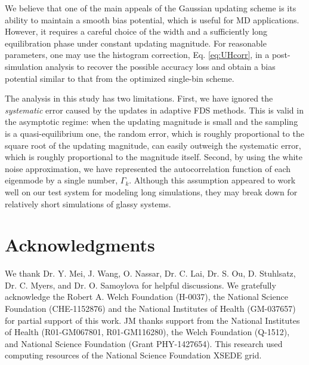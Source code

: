 \documentclass[reprint, superscriptaddress, floatfix]{revtex4-1}
\begin{document}
We believe that one of the main appeals
of the Gaussian updating scheme
is its ability to maintain a smooth bias potential,
which is useful for MD applications.
%
However, it requires a careful choice of the width and
a sufficiently long equilibration phase under constant updating magnitude.
%
For reasonable parameters,
one may use the histogram correction, Eq. \eqref{eq:UHcorr},
in a post-simulation analysis
to recover the possible accuracy loss
and obtain a bias potential similar to
that from the optimized single-bin scheme.



The analysis in this study has two limitations.
%
First, we have ignored the \emph{systematic}
error\cite{zhou2005, morozov2007, zhou2008}
caused by the updates in adaptive FDS methods.
%
This is valid in the asymptotic regime:
when the updating magnitude is small
and the sampling is a quasi-equilibrium one\cite{
  zhou2005, morozov2007, zhou2008, barducci2008, dama2014},
the random error,
which is roughly proportional to
the square root of the updating magnitude\cite{
  zhou2005, morozov2007, zhou2008, bussi2006},
can easily outweigh
the systematic error,
which is roughly proportional to
the magnitude itself\cite{morozov2007}.
%
%
Second, by using the white noise approximation,
we have represented the autocorrelation function
of each eigenmode by a single number, $\Gamma_k$.
%
Although this assumption appeared to work well
on our test system for modeling long simulations,
they may break down for relatively short simulations
of glassy systems.


\section{Acknowledgments}

We thank Dr. Y. Mei, J. Wang,
O. Nassar, Dr. C. Lai, Dr. S. Ou, D. Stuhlsatz,
Dr. C. Myers, and Dr. O. Samoylova
for helpful discussions.
%
We gratefully acknowledge the Robert A. Welch Foundation (H-0037),
the National Science Foundation (CHE-1152876)
and the National Institutes of Health (GM-037657)
for partial support of this work.
%
JM thanks support from the National Institutes of Health (R01-GM067801, R01-GM116280),
the Welch Foundation (Q-1512),
and National Science Foundation (Grant PHY-1427654).
%
This research used computing resources of the National Science Foundation XSEDE grid.
%
%
\end{document}
